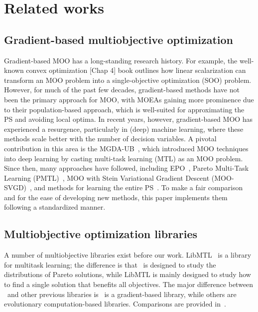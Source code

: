 \section{Related works}
\subsection{Gradient-based multiobjective optimization} \label{sec:gbmoo}
Gradient-based MOO has a long-standing research history. For example, the well-known convex optimization \cite{boyd2004convex}[Chap 4] book outlines how linear scalarization can transform an MOO problem into a single-objective optimization (SOO) problem. However, for much of the past few decades, gradient-based methods have not been the primary approach for MOO, with MOEAs gaining more prominence due to their population-based approach, which is well-suited for approximating the PS and avoiding local optima. In recent years, however, gradient-based MOO has experienced a resurgence, particularly in (deep) machine learning, where these methods scale better with the number of decision variables. A pivotal contribution in this area is the MGDA-UB~\cite{sener2018multi}, which introduced MOO techniques into deep learning by casting multi-task learning (MTL) as an MOO problem. Since then, many approaches have followed, including EPO~\cite{mahapatra2020multi}, Pareto Multi-Task Learning (PMTL)~\cite{lin2019pareto}, MOO with Stein Variational Gradient Descent (MOO-SVGD)~\cite{liu2021profiling}, and methods for learning the entire PS~\cite{lin2020controllable,navon2020learning,zhong2024panacea,lin2024smooth,lin2022pslmobo}. To make a fair comparison and for the ease of developing new methods, this paper implements them following a standardized manner.

\subsection{Multiobjective optimization libraries} \label{sec:moolib}
A number of multiobjective libraries exist before our work. LibMTL~\cite{lin2023libmtl} is a library for multitask learning; the difference is that \algoname~is designed to study the distributions of Pareto solutions, while LibMTL is mainly designed to study how to find a single solution that benefits all objectives. The major difference between \algoname~and other previous libraries is \algoname~is a gradient-based library, while others are evolutionary computation-based libraries. Comparisons are provided in~.

